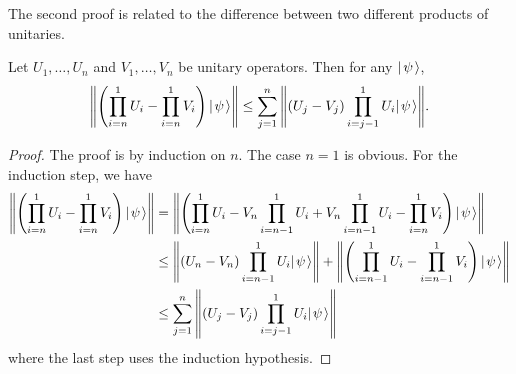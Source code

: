 \documentclass[../thesis-main/thesis-main]{subfiles}
\begin{document}
The second proof is related to the difference between two different products of unitaries.

\begin{proposition}
\label{prop:hybrid}Let $U_1,\ldots, U_n$ and $V_1,\ldots, V_n$  be unitary operators.  Then for any $|\mspace{2mu} \psi \mspace{2mu} \rangle$,
\begin{equation}
  \left\|{\left(\prod_{i=n}^1 U_i - \prod_{i=n}^1 V_i \right) |\mspace{2mu} \psi \mspace{2mu} \rangle}\right\|   \le \sum_{j=1}^n \Bigg\|{(U_j - V_j)\prod_{i=j-1}^1 U_i |\mspace{2mu} \psi \mspace{2mu} \rangle}\Bigg\|.
\end{equation}
\end{proposition}

\begin{proof}
The proof is by induction on $n$.  The case $n=1$ is obvious.  For the induction step, we have \begin{align}   \left\|{\left(\prod_{i=n}^1 U_i - \prod_{i=n}^1 V_i \right) |\mspace{2mu} \psi \mspace{2mu} \rangle}\right\|   &= \left\|{\left(\prod_{i=n}^1 U_i - V_n \prod_{i=n-1}^1 U_i             + V_n \prod_{i=n-1}^1 U_i - \prod_{i=n}^1 V_i \right) |\mspace{2mu} \psi \mspace{2mu} \rangle}\right\| \\   &\le \left\|{(U_n - V_n) \prod_{i=n-1}^1 U_i |\mspace{2mu} \psi \mspace{2mu} \rangle}\right\|       +\left\|{\left(\prod_{i=n-1}^1 U_i - \prod_{i=n-1}^1 V_i \right) |\mspace{2mu} \psi \mspace{2mu} \rangle}\right\| \\   &\le \sum_{j=1}^n \left\|{(U_j - V_j)\prod_{i=j-1}^1 U_i |\mspace{2mu} \psi \mspace{2mu} \rangle}\right\| \end{align} where the last step uses the induction hypothesis. 
\end{proof}
\end{document}

